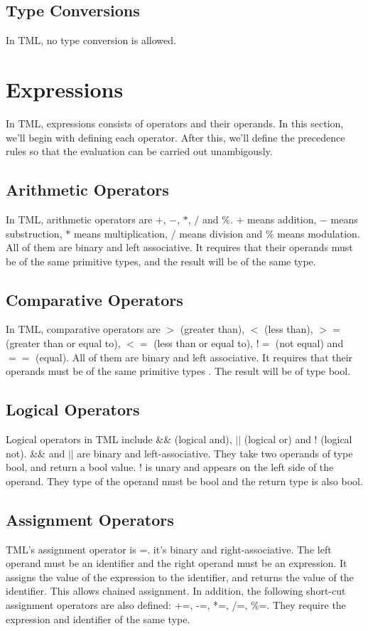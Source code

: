 \documentclass[12pt,psfig,a4]{article}
\begin{document}
\subsection {Type Conversions}
In TML, no type conversion is allowed.


\section{Expressions}
In TML, expressions consists of operators and their operands. In this section, we'll begin with defining each operator. After this, we'll define the precedence rules so that the evaluation can be carried out unambigously.

\subsection{Arithmetic Operators}
In TML, arithmetic operators are $+$, $-$, $*$, $/$ and $\%$. $+$ means addition, $-$ means substruction, $*$ means multiplication, $/$ means division and $\%$ means modulation. All of them are binary and left associative. It requires that their operands must be of the same primitive types, and the result will be of the same type.

\subsection{Comparative Operators}
In TML, comparative operators are $>$ (greater than), $<$ (less than), $>=$ (greater than or equal to), $<=$ (less than or equal to), $!=$ (not equal) and $==$ (equal). All of them are binary and left associative. It requires that their operands must be of the same primitive types . The result will be of type bool.

\subsection{Logical Operators}
Logical operators in TML include \&\& (logical and), $||$ (logical or) and ! (logical not). \&\& and $||$ are binary and left-associative. They take two operands of type bool, and return a bool value. ! is unary and appears on the left side of the operand. They type of the operand must be bool and the return type is also bool.

\subsection{Assignment Operators}
TML's assignment operator is =. it's binary and right-associative. The left operand must be an identifier and the right operand must be an expression. It assigns the value of the expression to the identifier, and returns the value of the identifier. This allows chained assignment. In addition, the following short-cut assignment operators are also defined: +=, -=, *=, /=, \%=. They require the expression and identifier of the same type.
\end{document}

